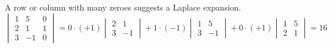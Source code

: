 \begin{example}
A row or column with many zeroes suggests a Laplace expansion.
\begin{equation*}
  \begin{vmatrix}
    1 &5  &0  \\
    2 &1  &1  \\
    3 &-1 &0
  \end{vmatrix}
   =
   0\cdot(+1)\begin{vmatrix}
               2  &1  \\
               3  &-1
             \end{vmatrix}+
   1\cdot(-1)\begin{vmatrix}
               1  &5  \\
               3  &-1
             \end{vmatrix}+
   0\cdot(+1)\begin{vmatrix}
               1  &5  \\
               2  &1
             \end{vmatrix}
  =16
\end{equation*}
\end{example}

